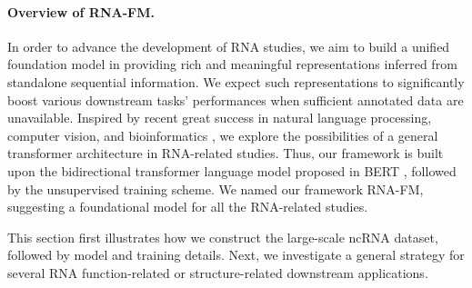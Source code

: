 \paragraph{Overview of RNA-FM.}
In order to advance the development of RNA studies, we aim to build a unified foundation model in providing rich and meaningful representations inferred from standalone sequential information. We expect such representations to significantly boost various downstream tasks' performances when sufficient annotated data are unavailable. Inspired by recent great success in natural language processing, computer vision, and bioinformatics \cite{vaswani2017attention}\cite{dosovitskiy2020image}\cite{rives2021biological}, we explore the possibilities of a general transformer architecture in RNA-related studies. Thus, our framework is built upon the bidirectional transformer language model proposed in BERT \cite{devlin2018bert}, followed by the unsupervised training scheme. We named our framework RNA-FM, suggesting a foundational model for all the RNA-related studies.

This section first illustrates how we construct the large-scale ncRNA dataset, followed by model and training details. Next, we investigate a general strategy for several RNA function-related or structure-related downstream applications.





